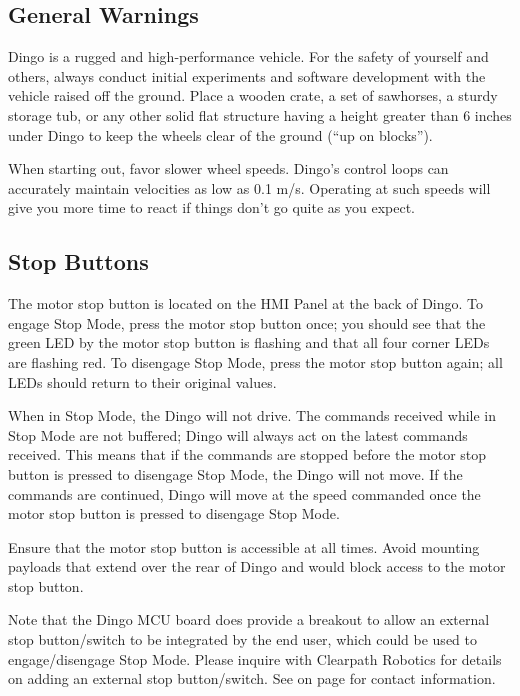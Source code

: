 \documentclass[]{clearpath-latex/clearpath-manual}
\begin{document}
\subsection{General Warnings}

Dingo is a rugged and high-performance vehicle. For the safety of yourself and others, always conduct initial experiments and software development with the vehicle raised off the ground. Place a wooden crate, a set of sawhorses, a sturdy storage tub, or any other solid flat structure having a height greater than 6 inches under Dingo to keep the wheels clear of the ground (“up on blocks”).

When starting out, favor slower wheel speeds. Dingo's control loops can accurately maintain velocities as low as 0.1 m/s. Operating at such speeds will give you more time to react if things don’t go quite as you expect.

\subsection{Stop Buttons}

The motor stop button  is located on the HMI Panel at the back of Dingo. To engage Stop Mode, press the motor stop button once; you should see that the green LED by the motor stop button is flashing and that all four corner LEDs are flashing red. To disengage Stop Mode, press the motor stop button again; all LEDs should return to their original values.

When in Stop Mode, the Dingo will not drive. The commands received while in Stop Mode are not buffered; Dingo will always act on the latest commands received. This means that if the commands are stopped before the motor stop button is pressed to disengage Stop Mode, the Dingo will not move. If the commands are continued, Dingo will move at the speed commanded once the motor stop button is pressed to disengage Stop Mode.

Ensure that the motor stop button is accessible at all times. Avoid mounting payloads that extend over the rear of Dingo and would block access to the motor stop button.

Note that the Dingo MCU board does provide a breakout to allow an external stop button/switch to be integrated by the end user, which could be used to engage/disengage Stop Mode. Please inquire with Clearpath Robotics for details on adding an external stop button/switch. See  on page \pageref{contact} for contact information.
\end{document}
